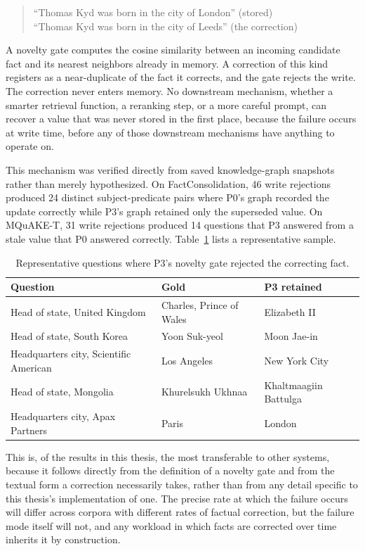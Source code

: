 \begin{quote}
\ttfamily
``Thomas Kyd was born in the city of London'' \quad (stored) \\
``Thomas Kyd was born in the city of Leeds'' \quad (the correction)
\end{quote}

A novelty gate computes the cosine similarity between an incoming candidate fact and its nearest neighbors already in memory. A correction of this kind registers as a near-duplicate of the fact it corrects, and the gate rejects the write. The correction never enters memory. No downstream mechanism, whether a smarter retrieval function, a reranking step, or a more careful prompt, can recover a value that was never stored in the first place, because the failure occurs at write time, before any of those downstream mechanisms have anything to operate on.

This mechanism was verified directly from saved knowledge-graph snapshots rather than merely hypothesized. On FactConsolidation, 46 write rejections produced 24 distinct subject-predicate pairs where P0's graph recorded the update correctly while P3's graph retained only the superseded value. On MQuAKE-T, 31 write rejections produced 14 questions that P3 answered from a stale value that P0 answered correctly. Table~\ref{tab:novelty-failures} lists a representative sample.

\begin{table}[H]
\centering
\caption{Representative questions where P3's novelty gate rejected the correcting fact.}
\label{tab:novelty-failures}
\small
\begin{tabular}{p{4.2cm}p{3.2cm}p{3.2cm}}
\toprule
Question & Gold & P3 retained \\
\midrule
Head of state, United Kingdom & Charles, Prince of Wales & Elizabeth II \\
Head of state, South Korea & Yoon Suk-yeol & Moon Jae-in \\
Headquarters city, Scientific American & Los Angeles & New York City \\
Head of state, Mongolia & Khurelsukh Ukhnaa & Khaltmaagiin Battulga \\
Headquarters city, Apax Partners & Paris & London \\
\bottomrule
\end{tabular}
\end{table}

This is, of the results in this thesis, the most transferable to other systems, because it follows directly from the definition of a novelty gate and from the textual form a correction necessarily takes, rather than from any detail specific to this thesis's implementation of one. The precise rate at which the failure occurs will differ across corpora with different rates of factual correction, but the failure mode itself will not, and any workload in which facts are corrected over time inherits it by construction.

